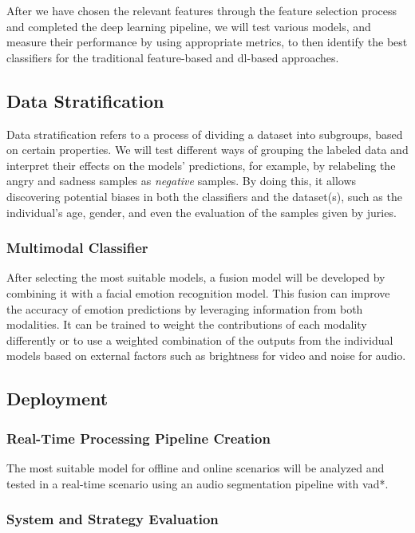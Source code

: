 After we have chosen the relevant features through the feature selection process and completed the deep learning pipeline, we will test various models, and measure their performance by using appropriate metrics, to then identify the best classifiers for the traditional feature-based and \ac{dl}-based approaches.


\subsection{Data Stratification}

Data stratification refers to a process of dividing a dataset into subgroups, based on certain properties. We will test different ways of grouping the labeled data and interpret their effects on the models' predictions, for example, by relabeling the angry and sadness samples as \textit{negative} samples. By doing this, it allows discovering potential biases in both the classifiers and the dataset(s), such as the individual's age, gender, and even the evaluation of the samples given by juries.

\subsubsection{Multimodal Classifier}

After selecting the most suitable models, a fusion model will be developed by combining it with a facial emotion recognition model. This fusion can improve the accuracy of emotion predictions by leveraging information from both modalities. It can be trained to weight the contributions of each modality differently or to use a weighted combination of the outputs from the individual models based on external factors such as brightness for video and noise for audio.


\subsection{Deployment}

\subsubsection{Real-Time Processing Pipeline Creation}

The most suitable model for offline and online scenarios will be analyzed and tested in a real-time scenario using an audio segmentation pipeline with \ac{vad*}.

\subsubsection{System and Strategy Evaluation}

